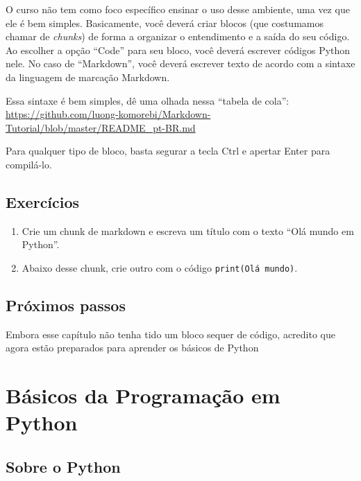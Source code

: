 \documentclass[a4paper, 11pt, brazilian]{article}
\providecommand{\tightlist}{%
      \setlength{\itemsep}{0pt}\setlength{\parskip}{0pt}}
\begin{document}
O curso não tem como foco específico ensinar o uso desse ambiente, uma
vez que ele é bem simples. Basicamente, você deverá criar blocos (que
costumamos chamar de \emph{chunks}) de forma a organizar o entendimento
e a saída do seu código. Ao escolher a opção ``Code'' para seu bloco,
você deverá escrever códigos Python nele. No caso de ``Markdown'', você
deverá escrever texto de acordo com a sintaxe da linguagem de marcação
Markdown.

Essa sintaxe é bem simples, dê uma olhada nessa ``tabela de cola'':
\url{https://github.com/luong-komorebi/Markdown-Tutorial/blob/master/README_pt-BR.md}

Para qualquer tipo de bloco, basta segurar a tecla Ctrl e apertar Enter
para compilá-lo.

    \hypertarget{exercuxedcios}{%
\subsection{Exercícios}\label{exercuxedcios}}

\begin{enumerate}
\def\labelenumi{\arabic{enumi}.}
\tightlist
\item
  Crie um chunk de markdown e escreva um título com o texto ``Olá mundo
  em Python''.
\item
  Abaixo desse chunk, crie outro com o código
  \texttt{print(\textquotesingle{}Olá\ mundo\textquotesingle{})}.
\end{enumerate}

    \hypertarget{pruxf3ximos-passos}{%
\subsection{Próximos passos}\label{pruxf3ximos-passos}}

Embora esse capítulo não tenha tido um bloco sequer de código, acredito
que agora estão preparados para aprender os básicos de Python

    \hypertarget{buxe1sicos-da-programauxe7uxe3o-em-python}{%
\section{Básicos da Programação em
Python}\label{buxe1sicos-da-programauxe7uxe3o-em-python}}

\hypertarget{sobre-o-python}{%
\subsection{Sobre o Python}\label{sobre-o-python}}
\end{document}
